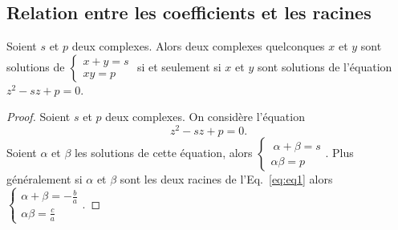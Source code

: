 \subsection{Relation entre les coefficients et les racines}
\label{subsec:relationcoefsracines}
% 
\begin{prop}
  Soient $s$ et $p$ deux complexes. Alors deux complexes quelconques $x$ et $y$ sont solutions de $\begin{cases} x +y = s \\ xy=p \end{cases}$ si et seulement si $x$ et $y$ sont solutions de l'équation $z^2 -sz+p=0$.
\end{prop}
\begin{proof}
  Soient $s$ et $p$ deux complexes. On considère l'équation 
  \begin{equation}
    z^2-sz+p=0.
  \end{equation}
  Soient $\alpha$ et $\beta$ les solutions de cette équation, alors 
  $\begin{cases} \
    \alpha +\beta = s \\ 
    \alpha \beta=p 
  \end{cases}$.
  Plus généralement si $\alpha$ et $\beta$ sont les deux racines de l'Eq.~\eqref{eq:eq1} alors $\begin{cases} \alpha + \beta = -\frac{b}{a} \\ \alpha \beta = \frac{c}{a} \end{cases}$.
\end{proof}
% 
